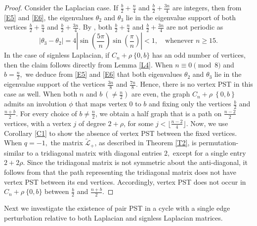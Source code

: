 \documentclass[12pt,a4paper]{article}
\newcommand{\ob}[1]{\left(#1\right)}
\newcommand{\cb}[1]{\left\lbrace #1\right\rbrace}
\begin{document}
\begin{proof}
Consider the Laplacian case. If $\frac{b}{2} + \frac{n}{4}$ and $\frac{b}{2} + \frac{3n}{4}$ are integers, then from \eqref{E5} and \eqref{E6}, the eigenvalues $\theta_2$ and $\theta_3$ lie in the eigenvalue support of both vertices $\frac{b}{2} + \frac{n}{4}$ and $\frac{b}{2} + \frac{3n}{4}$. By \cite[Theorem 4]{kirk4}, both $\frac{b}{2} + \frac{n}{4}$ and $\frac{b}{2} + \frac{3n}{4}$ are not periodic as
\begin{equation*}
|\theta_3-\theta_2| = 4\left|\sin\ob{\frac{5\pi}{n}} \sin\ob{\frac{\pi}{n}} \right|
    <1,\quad \text{whenever }n \geq 15.
\end{equation*}
In the case of signless Laplacian, if $C_n + \rho~\{0,b\}$ has an odd number of vertices, then the claim follows directly from Lemma \ref{L4}. When $n\equiv 0\pmod 8$ and $b=\frac{n}{2},$ we deduce from \eqref{E5} and \eqref{E6} that both eigenvalues $\theta_2$ and $\theta_3$ lie in the eigenvalue support of the vertices $\frac{3n}{8}$ and $\frac{7n}{8}$. Hence, there is no vertex PST in this case as well. When both $n$ and $b~(\neq \frac{n}{2})$ are even, the graph $C_n + \rho~\cb{0,b}$ admits an involution $\phi$ that maps vertex $0$ to $b$ and fixing only the vertices $\frac{b}{2}$ and $\frac{n+b}{2}.$ For every choice of $b\neq \frac{n}{2}$, we obtain a half graph that is a path on $\frac{n-2}{2}$ vertices, with a vertex $j$ of degree $2+\rho$, for some $j<\lfloor \frac{n-2}{4}\rfloor$. Now, we use Corollary \ref{C1} to show the absence of vertex PST between the fixed vertices. When $q=-1,$ the matrix $\widetilde{\mathscr{L}}_+$, as described in Theorem \ref{T2}, is permutation-similar to a tridiagonal matrix with diagonal entries $2,$ except for a single entry $2+2\rho.$
Since the tridiagonal matrix is not symmetric about the anti-diagonal, 
it follows from \cite[Lemma 2]{kay2} that the path representing the tridiagonal matrix does not have vertex PST between its end vertices. Accordingly, vertex PST does not occur in $C_n + \rho~\{0,b\}$ between $\frac{b}{2}$ and $\frac{n+b}{2}.$ 
\end{proof}
Next we investigate the existence of pair PST in a cycle with a single edge perturbation relative to both Laplacian and signless Laplacian matrices.
\end{document}
